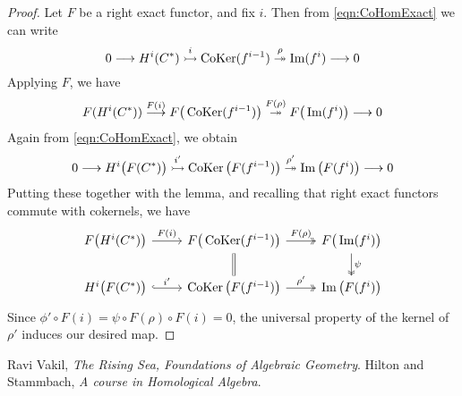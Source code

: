 \documentclass[a4paper]{article}
\def\mono{\rightarrowtail}
\def\epi{\twoheadrightarrow}
\begin{document}
\begin{proof}
    Let $F$ be a right exact functor, and fix $i$. Then from \ref{eqn:CoHomExact} we can write
    \[
        0 \to H^i(C^*) \stackrel{i}{\mono} \CoKer(f^{i-1}) \stackrel{\rho}{\epi} \im(f^i) \to 0
    \]
    Applying $F$, we have
    \[
         F(H^i(C^*)) \stackrel{F(i)}{\to} F\big(\CoKer(f^{i-1})\big) \stackrel{F(\rho)}{\epi} F\big(\im(f^i)\big) \to 0
    \]
    Again from \ref{eqn:CoHomExact}, we obtain 
    \[
        0 \to H^i\big(F(C^*)\big) \stackrel{i'}{\mono} \CoKer\big(F(f^{i-1})\big) \stackrel{\rho'}{\epi} \im\big(F(f^i)\big) \to 0
    \]
    Putting these together with the lemma, and recalling that right exact functors commute with cokernels, we have
    \[
        \begin{tikzcd}
            F\big( H^i(C^*)\big) \arrow[r,"F(i)"] & F\big(\CoKer(f^{i-1})\big) \arrow[d, equal]\arrow[r, "F(\rho)", two heads] & F\big(\im(f^i)\big) \arrow[d, "\psi", two heads]\\
            H^i\big(F(C^*)\big) \arrow[r, "i'", hook] & \CoKer\big(F(f^{i-1})\big) \arrow[r, "\rho'", two heads] & \im\big(F(f^i)\big)
        \end{tikzcd}
    \]
    Since $\phi' \circ F(i) = \psi \circ F(\rho) \circ F(i)= 0$, the universal property of the kernel of $\rho'$ induces our desired map.
\end{proof}


\begin{thebibliography}{9}
  Ravi Vakil,
  \emph{The Rising Sea, Foundations of Algebraic Geometry}.
  Hilton and Stammbach,
  \emph{A course in Homological Algebra}.
\end{thebibliography}
\end{document}
